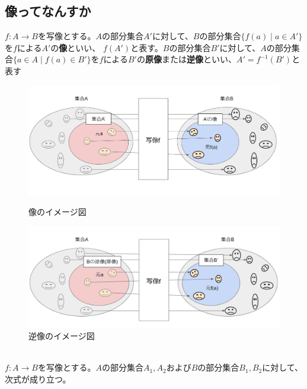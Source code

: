 \documentclass[a4j,dvipdfmx]{jsarticle}
\begin{document}
\subsection{像ってなんすか}
$f:A\to B$を写像とする。$A$の部分集合$A'$に対して、$B$の部分集合$\{f(a)\mid a\in A'\}$を$f$による$A'$の\textbf{像}といい、
$f(A')$と表す。$B$の部分集合$B'$に対して、$A$の部分集合$\{a\in A \mid f(a)\in B'\}$を$f$による$B'$の\textbf{原像}または\textbf{逆像}といい、$A'=f^{-1}(B')$と表す

\begin{figure}[h]
    \begin{minipage}{0.5\linewidth}
        \centering
        \includegraphics[keepaspectratio,scale=0.35]{img/写像_像.png}
        \caption{像のイメージ図}
      \end{minipage}
      \begin{minipage}{0.6\linewidth}
        \centering
        \includegraphics[keepaspectratio, scale=0.35]{img/写像_逆増.png}
        \caption{逆像のイメージ図}
      \end{minipage}
\end{figure}
\hrulefill\\
$f:A\to B$を写像とする。$A$の部分集合$A_1,A_2$および$B$の部分集合$B_1,B_2$に対して、次式が成り立つ。
\end{document}
